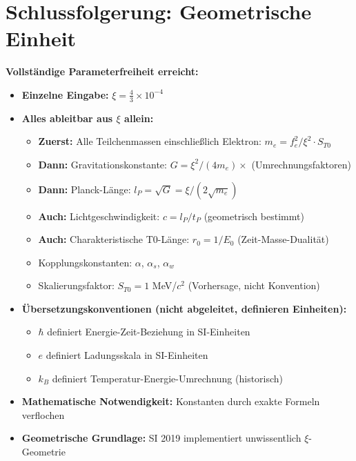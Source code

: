 \documentclass[12pt,a4paper]{article}
\begin{document}
	\section{Schlussfolgerung: Geometrische Einheit}
	
	\begin{keyresult}
		\textbf{Vollst{\"a}ndige Parameterfreiheit erreicht:}
		\begin{itemize}
			\item \textbf{Einzelne Eingabe:} $\xi = \frac{4}{3} \times 10^{-4}$
			
			\item \textbf{Alles ableitbar aus $\xi$ allein:}
			\begin{itemize}
				\item \textbf{Zuerst:} Alle Teilchenmassen einschlie{\ss}lich Elektron: $m_e = f_e^2/\xi^2 \cdot S_{T0}$
				\item \textbf{Dann:} Gravitationskonstante: $G = \xi^2/(4m_e) \times$ (Umrechnungsfaktoren)
				\item \textbf{Dann:} Planck-L{\"a}nge: $l_P = \sqrt{G} = \xi/(2\sqrt{m_e})$
				\item \textbf{Auch:} Lichtgeschwindigkeit: $c = l_P/t_P$ (geometrisch bestimmt)
				\item \textbf{Auch:} Charakteristische T0-L{\"a}nge: $r_0 = 1/E_0$ (Zeit-Masse-Dualit{\"a}t)
				\item Kopplungskonstanten: $\alpha$, $\alpha_s$, $\alpha_w$
				\item Skalierungsfaktor: $S_{T0} = 1$ MeV/$c^2$ (Vorhersage, nicht Konvention)
			\end{itemize}
			
			\item \textbf{{\"U}bersetzungskonventionen (nicht abgeleitet, definieren Einheiten):}
			\begin{itemize}
				\item $\hbar$ definiert Energie-Zeit-Beziehung in SI-Einheiten
				\item $e$ definiert Ladungsskala in SI-Einheiten
				\item $k_B$ definiert Temperatur-Energie-Umrechnung (historisch)
			\end{itemize}
			
			\item \textbf{Mathematische Notwendigkeit:} Konstanten durch exakte Formeln verflochen
			
			\item \textbf{Geometrische Grundlage:} SI 2019 implementiert unwissentlich $\xi$-Geometrie
		\end{itemize}
	\end{keyresult}
	
\end{document}
